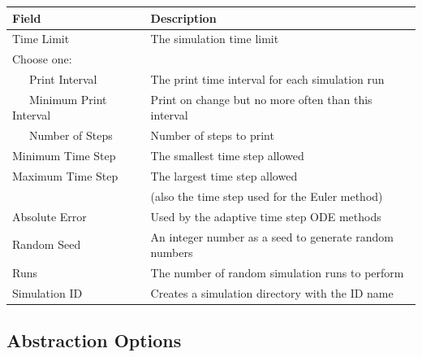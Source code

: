 \documentclass[titlepage,11pt]{article}
\begin{document}
\begin{center}
\begin{tabular}{|l|l|}
\hline
Field             & Description \\ \hline \hline
Time Limit        & The simulation time limit \\ \hline
Choose one:    &  \\ \hline
~~~Print Interval    & The print time interval for each simulation run \\ \hline 
~~~Minimum Print Interval    & Print on change but no more often than this interval \\ \hline  
~~~Number of Steps    & Number of steps to print \\ \hline  
Minimum Time Step & The smallest time step allowed \\ \hline
Maximum Time Step & The largest time step allowed \\ 
      ~           & (also the time step used for the Euler method) \\ \hline
Absolute Error    & Used by the adaptive time step ODE methods \\ \hline
Random Seed       & An integer number as a seed to generate random numbers \\ \hline
Runs              & The number of random simulation runs to perform \\ \hline
Simulation ID     & Creates a simulation directory with the ID name \\ \hline
\end{tabular}
\end{center}

\clearpage

\subsection{\label{absOptions}Abstraction Options}
\end{document}
